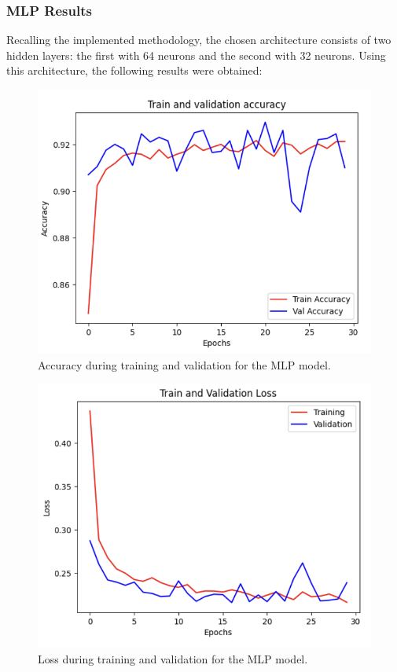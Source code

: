 \subsubsection{MLP Results}

Recalling the implemented methodology, the chosen architecture consists of two hidden layers: the first with 64 neurons and the second with 32 neurons. Using this architecture, the following results were obtained:

\begin{figure}[H]
    \centering
    \includegraphics[width=\linewidth]{images/mlp_accuracy_training_And_Validation.png}
    \caption{Accuracy during training and validation for the MLP model.}
    \label{fig:mlp_accuracy_training_validation}
\end{figure}

\begin{figure}[H]
    \centering
    \includegraphics[width=\linewidth]{images/mlpTrainAndValidationLoss.png}
    \caption{Loss during training and validation for the MLP model.}
    \label{fig:mlp_loss_training_validation}
\end{figure}


